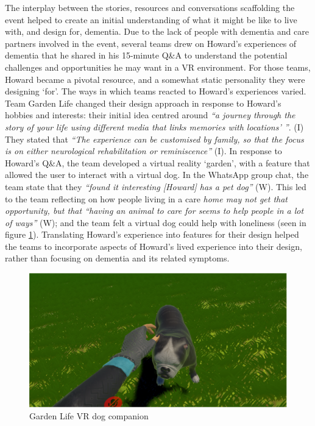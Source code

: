 The interplay between the stories, resources and conversations scaffolding the event helped to create an initial understanding of what it might be like to live with, and design for, dementia. Due to the lack of people with dementia and care partners involved in the event, several teams drew on Howard’s experiences of dementia that he shared in his 15-minute Q\&A to understand the potential challenges and opportunities he may want in a VR environment. For those teams, Howard became a pivotal resource, and a somewhat static personality they were designing `for'. The ways in which teams reacted to Howard’s experiences varied. Team Garden Life changed their design approach in response to Howard's hobbies and interests: their initial idea centred around \textit{``a journey through the story of your life using different media that links memories with locations' ''}. (I) They stated that \textit{``The experience can be customised by family, so that the focus is on either neurological rehabilitation or reminiscence''} (I). In response to Howard’s Q\&A, the team developed a virtual reality `garden', with a feature that allowed the user to interact with a virtual dog. In the WhatsApp group chat, the team state that they \textit{``found it interesting [Howard] has a pet dog''} (W). This led to the team reflecting on how people living in a care \textit{home may not get that opportunity, but that ``having an animal to care for seems to help people in a lot of ways''} (W); and the team felt a virtual dog could help with loneliness (seen in figure \ref{fig:GardenLifeDog}). Translating Howard's experience into features for their design helped the teams to incorporate aspects of Howard's lived experience into their design, rather than focusing on dementia and its related symptoms. 

\begin{figure}[htp]
\centering
\includegraphics[width=.8\linewidth]{Images/DemVR/Findings/GadenLifeVR.png}
\caption{Garden Life VR dog companion}
\label{fig:GardenLifeDog}
\end{figure}

